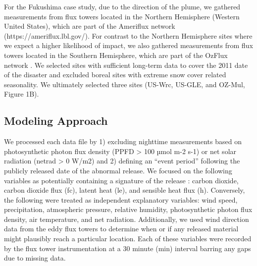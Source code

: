 \documentclass{article}
\begin{document}
For the Fukushima case study, due to the direction of the plume, we gathered measurements from flux towers located in the Northern Hemisphere (Western United States), which are part of the Ameriflux network (https://ameriflux.lbl.gov/). For contrast to the Northern Hemisphere sites where we expect a higher likelihood of impact, we also gathered measurements from flux towers located in the Southern Hemisphere, which are part of the OzFlux network \citep{cleverly2011alice}. We selected sites with sufficient long-term data to cover the 2011 date of the disaster and excluded boreal sites with extreme snow cover related seasonality. We ultimately selected three sites (US-Wrc, US-GLE, and OZ-Mul, Figure 1B).

\subsection{Modeling Approach}
We processed each data file by 1) excluding nighttime measurements based on photosynthetic photon flux density (PPFD > 100 µmol m-2 s-1) or net solar radiation (netrad > 0 W/m2) and 2) defining an “event period” following the publicly released date of the abnormal release. We focused on the following variables as potentially containing a signature of the release : carbon dioxide, carbon dioxide flux (fc), latent heat (le), and sensible heat flux (h). Conversely, the following were treated as independent explanatory variables: wind speed, precipitation, atmospheric pressure, relative humidity, photosynthetic photon flux density, air temperature, and net radiation. Additionally, we used wind direction data from the eddy flux towers to determine when or if any released material might plausibly reach a particular location. Each of these variables were recorded by the flux tower instrumentation at a 30 minute (min) interval barring any gaps due to missing data.
\end{document}
